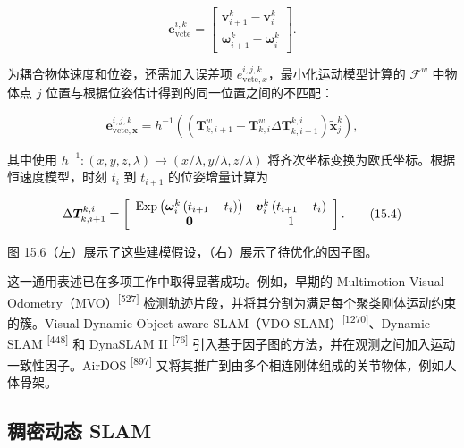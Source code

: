 \begin{equation}
\boldsymbol {e} _ {\mathrm{vcte}} ^ {i, k} = \left[ \begin{array}{c} \boldsymbol {v} _ {i + 1} ^ {k} - \boldsymbol {v} _ {i} ^ {k} \\ \boldsymbol {\omega} _ {i + 1} ^ {k} - \boldsymbol {\omega} _ {i} ^ {k} \end{array} \right].\tag{15.2}
\end{equation}

为耦合物体速度和位姿，还需加入误差项 $e_{\mathrm{vcte},x}^{i,j,k}$，最小化运动模型计算的 ${\mathcal{F}}^w$ 中物体点 $j$ 位置与根据位姿估计得到的同一位置之间的不匹配：

\begin{equation}
\pmb {e} _ {\mathrm{vcte}, \pmb {x}} ^ {i, j, k} = h ^ {- 1 } \left(\left(\pmb {T} _ {k, i + 1} ^ {w} - \pmb {T} _ {k, i} ^ {w} \Delta \pmb {T} _ {k, i + 1} ^ {k, i}\right) \tilde {\pmb {x}} _ {j} ^ {k}\right),\tag{15.3}
\end{equation}

其中使用 $h^{-1}:(x,y,z,\lambda)\to(x/\lambda,y/\lambda,z/\lambda)$ 将齐次坐标变换为欧氏坐标。根据恒速度模型，时刻 $t_i$ 到 $t_{i+1}$ 的位姿增量计算为

\begin{equation}
\Delta \boldsymbol {T} _ {k, i + 1} ^ {k, i} = \left[ \begin{array}{c c} \operatorname{Exp} \left(\boldsymbol {\omega} _ {i} ^ {k} \left(t _ {i + 1} - t _ {i}\right)\right) & \boldsymbol {v} _ {i} ^ {k} \left(t _ {i + 1} - t _ {i}\right) \\ \boldsymbol {0} & 1 \end{array} \right].\tag{15.4}
\end{equation}

图 15.6（左）展示了这些建模假设，（右）展示了待优化的因子图。

这一通用表述已在多项工作中取得显著成功。例如，早期的 Multimotion Visual Odometry（MVO）\textsuperscript{[527]} 检测轨迹片段，并将其分割为满足每个聚类刚体运动约束的簇。Visual Dynamic Object-aware SLAM（VDO-SLAM）\textsuperscript{[1270]}、Dynamic SLAM \textsuperscript{[448]} 和 DynaSLAM II \textsuperscript{[76]} 引入基于因子图的方法，并在观测之间加入运动一致性因子。AirDOS \textsuperscript{[897]} 又将其推广到由多个相连刚体组成的关节物体，例如人体骨架。

\subsection{稠密动态 SLAM}

